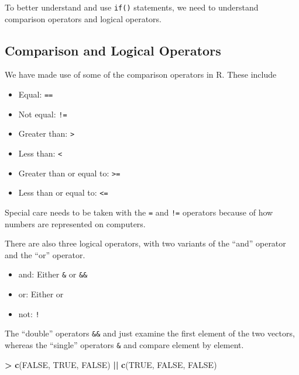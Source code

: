 \documentclass[]{krantz}
\makeatletter
\newenvironment{Shaded}{\begin{snugshade}}{\end{snugshade}}
\newcommand{\KeywordTok}[1]{\textcolor[rgb]{0.27,0.27,0.27}{\textbf{#1}}}
\newcommand{\StringTok}[1]{\textcolor[rgb]{0.5,0.5,0.5}{#1}}
\newcommand{\OtherTok}[1]{\textcolor[rgb]{0.37,0.37,0.37}{#1}}
\newcommand{\OperatorTok}[1]{\textcolor[rgb]{0.43,0.43,0.43}{\textbf{#1}}}
\newcommand{\NormalTok}[1]{#1}
\providecommand{\tightlist}{%
  \setlength{\itemsep}{0pt}\setlength{\parskip}{0pt}}
\newenvironment{kframe}{%
\medskip{}
\setlength{\fboxsep}{.8em}
 \def\at@end@of@kframe{}%
 \ifinner\ifhmode%
  \def\at@end@of@kframe{\end{minipage}}%
  \begin{minipage}{\columnwidth}%
 \fi\fi%
 \def\FrameCommand##1{\hskip\@totalleftmargin \hskip-\fboxsep
 \colorbox{shadecolor}{##1}\hskip-\fboxsep
     \hskip-\linewidth \hskip-\@totalleftmargin \hskip\columnwidth}%
 \MakeFramed {\advance\hsize-\width
   \@totalleftmargin\z@ \linewidth\hsize
   \@setminipage}}%
 {\par\unskip\endMakeFramed%
 \at@end@of@kframe}
\renewenvironment{Shaded}{\begin{kframe}}{\end{kframe}}
\theoremstyle{definition}
\theoremstyle{definition}
\theoremstyle{definition}
\theoremstyle{remark}
\makeatother
\begin{document}
To better understand and use \texttt{if()} statements, we need to
understand comparison operators and logical operators.

\subsection{Comparison and Logical
Operators}\label{comparison-and-logical-operators}

We have made use of some of the comparison operators in R. These include

\begin{itemize}
\tightlist
\item
  Equal: \texttt{==}
\item
  Not equal: \texttt{!=}
\item
  Greater than: \texttt{\textgreater{}}
\item
  Less than: \texttt{\textless{}}
\item
  Greater than or equal to: \texttt{\textgreater{}=}
\item
  Less than or equal to: \texttt{\textless{}=}
\end{itemize}

Special care needs to be taken with the \texttt{=} and \texttt{!=}
operators because of how numbers are represented on computers.

There are also three logical operators, with two variants of the ``and''
operator and the ``or'' operator.

\begin{itemize}
\tightlist
\item
  and: Either \texttt{\&} or \texttt{\&\&}
\item
  or: Either \texttt{\textbar{}} or \texttt{\textbar{}\textbar{}}
\item
  not: \texttt{!}
\end{itemize}

The ``double'' operators \texttt{\&\&} and \texttt{\textbar{}\textbar{}}
just examine the first element of the two vectors, whereas the
``single'' operators \texttt{\&} and \texttt{\textbar{}} compare element
by element.

\begin{Shaded}
\begin{Highlighting}[]
\OperatorTok{>}\StringTok{ }\KeywordTok{c}\NormalTok{(}\OtherTok{FALSE}\NormalTok{, }\OtherTok{TRUE}\NormalTok{, }\OtherTok{FALSE}\NormalTok{) }\OperatorTok{||}\StringTok{ }\KeywordTok{c}\NormalTok{(}\OtherTok{TRUE}\NormalTok{, }\OtherTok{FALSE}\NormalTok{, }\OtherTok{FALSE}\NormalTok{)}
\end{Highlighting}
\end{Shaded}
\end{document}
